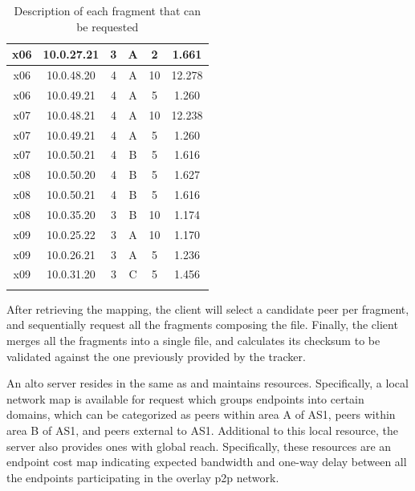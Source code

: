\begin{table}[H]
\begin{tabular}{|c|c|c|c|c|c|}
   x06   & 10.0.27.21   & 3  &  A  & 2                & 1.661  \\ \hline
   x06   & 10.0.48.20   & 4  &  A  & 10               & 12.278 \\ \hline
   x06   & 10.0.49.21   & 4  &  A  & 5                & 1.260  \\ \thickhline

   x07   & 10.0.48.21   & 4  &  A  & 10               & 12.238 \\ \hline
   x07   & 10.0.49.21   & 4  &  A  & 5                & 1.260  \\ \hline
   x07   & 10.0.50.21   & 4  &  B  & 5                & 1.616  \\ \thickhline

   x08   & 10.0.50.20   & 4  &  B  & 5                & 1.627  \\ \hline
   x08   & 10.0.50.21   & 4  &  B  & 5                & 1.616  \\ \hline
   x08   & 10.0.35.20   & 3  &  B  & 10               & 1.174  \\ \thickhline

   x09   & 10.0.25.22   & 3  &  A  & 10               & 1.170  \\ \hline
   x09   & 10.0.26.21   & 3  &  A  & 5                & 1.236  \\ \hline
   x09   & 10.0.31.20   & 3  &  C  & 5                & 1.456  \\ \thickhline
\end{tabular}
\caption{Description of each fragment that can be requested}
\label{table:fragment-allocations}
\end{table}

    After retrieving the mapping, the client will select a candidate peer per fragment, and sequentially request all the fragments composing the file.
    Finally, the client merges all the fragments into a single file, and calculates its checksum to be validated against the one previously provided by the tracker.

    An \gls{alto} server resides in the same \gls{as} and maintains resources.
    Specifically, a local network map is available for request which groups endpoints into certain domains, which can be categorized as peers within area A of AS1, peers within area B of AS1, and peers external to AS1.
    Additional to this local resource, the server also provides ones with global reach.
    Specifically, these resources are an endpoint cost map indicating expected bandwidth and one-way delay between all the endpoints participating in the overlay \gls{p2p} network.

